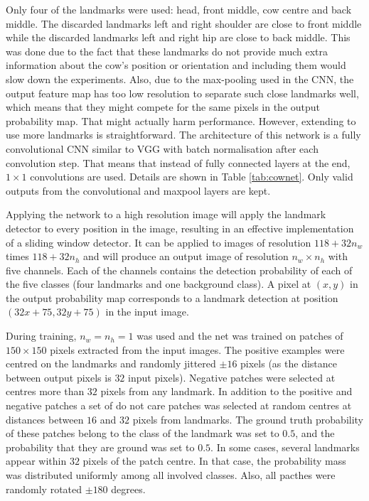 \documentclass{cta-author}
\begin{document}
Only four of the landmarks were used: head, front middle, cow centre and back middle.
The discarded landmarks left and right shoulder are close to front middle while the discarded landmarks left
and right hip are close to back middle. This was done due to the fact that these landmarks do 
not provide much extra information about the cow's position or
orientation and including them would slow down the experiments. Also, due to the max-pooling used in the CNN,
the output feature map has too low resolution to separate such close landmarks well, which means that they
might compete for the same pixels in the output probability map. That might actually harm performance.
However, extending to use more landmarks is straightforward. The architecture of this network is a fully
convolutional CNN similar to VGG \cite{Simonyan14c} with batch normalisation
\cite{DBLP:journals/corr/IoffeS15} after each convolution step. That means that instead of fully connected
layers at the end, $1 \times 1$ convolutions are used. Details are shown in Table \ref{tab:cownet}. Only
valid outputs from the convolutional and maxpool layers are kept.

Applying the network to a high resolution image will apply the landmark detector to every position in the
image, resulting in an effective implementation of a sliding window detector. It can be applied to images of
resolution $118 + 32 n_w$ times $118 + 32 n_h$ and will produce an output image of resolution $n_w \times
n_h$ with five channels. Each of the channels contains the detection probability of each of the five classes
(four landmarks and one background class). A pixel at $\left(x, y\right)$ in the output probability map
corresponds to a landmark detection at position $\left(32 x + 75, 32 y + 75\right)$ in the input image.

During training, $n_w = n_h = 1$ was used and the net was trained on patches of $150\times 150$ pixels
extracted from the input images. The positive examples were centred on the landmarks and randomly jittered
$\pm 16$ pixels (as the distance between output pixels is $32$ input pixels). Negative patches were selected
at centres more than $32$ pixels from any landmark. In addition to the positive and negative patches a set of
do not care patches was selected at random centres at distances between $16$ and $32$ pixels from landmarks.
The ground truth probability of these patches belong to the class of the landmark was set to $0.5$, and the
probability that they are ground was set to $0.5$. In some cases, several landmarks appear within $32$ pixels
of the patch centre. In that case, the probability mass was distributed uniformly among all involved classes.
Also, all pacthes were randomly rotated $\pm 180$ degrees.
\end{document}
